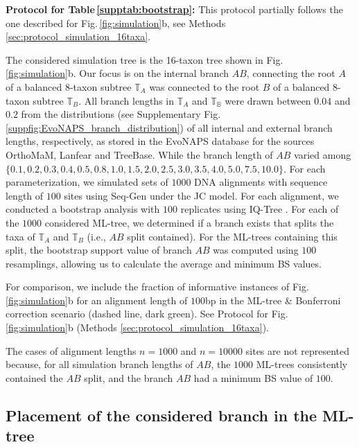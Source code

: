 \begin{appendices}
\noindent\textbf{Protocol for Table\,\ref{supptab:bootstrap}:} This protocol partially follows the one described for Fig.\,\ref{fig:simulation}b, see Methods \ref{sec:protocol_simulation_16taxa}.

The considered simulation tree is the 16-taxon tree shown in Fig.\,\ref{fig:simulation}b. Our focus is on the internal branch $AB$, connecting the root $A$ of a balanced $8$-taxon subtree $\mathbb{T}_A$ was connected to the root $B$ of a balanced $8$-taxon subtree $\mathbb{T}_B$. All branch lengths in $\mathbb{T}_A$ and $\mathbb{T_B}$ were drawn between $0.04$ and $0.2$ from the distributions (see Supplementary Fig.\,\ref{suppfig:EvoNAPS_branch_distribution}) of all internal and external branch lengths, respectively, as stored in the EvoNAPS database  for the sources OrthoMaM, Lanfear and TreeBase. While the branch length of $AB$ varied among $\{0.1, 0.2, 0.3, 0.4, 0.5, 0.8, 1.0, 1.5, 2.0, 2.5, 3.0, 3.5, 4.0, 5.0, 7.5, 10.0\}$. For each parameterization, we simulated sets of $1000$ DNA alignments with sequence length of $100$ sites using Seq-Gen  under the JC model. For each alignment, we conducted a bootstrap analysis with $100$ replicates using IQ-Tree . For each of the $1000$ considered ML-tree, we determined if a branch exists that splits the taxa of $\mathbb{T}_A$ and $\mathbb{T}_B$ (i.e., $AB$ split contained). For the ML-trees containing this split, the bootstrap support value of branch $AB$ was computed using $100$ resamplings, allowing us to calculate the average and minimum BS values.


For comparison, we include the fraction of informative instances of Fig.\,\ref{fig:simulation}b for an alignment length of $100$bp in the ML-tree \& Bonferroni correction scenario (dashed line, {\color{MLtreeBonferroni} dark green}). See  Protocol for Fig.\,\ref{fig:simulation}b (Methods \ref{sec:protocol_simulation_16taxa}).

\medskip

The cases of alignment lengths $n=1000$ and $n=10000$ sites are not represented because, for all simulation branch lengths of $AB$, the $1000$ ML-trees consistently contained the $AB$ split, and the branch $AB$ had a minimum BS value of $100$.

\medskip

\subsection{Placement of the considered branch in the ML-tree}



\end{appendices}
